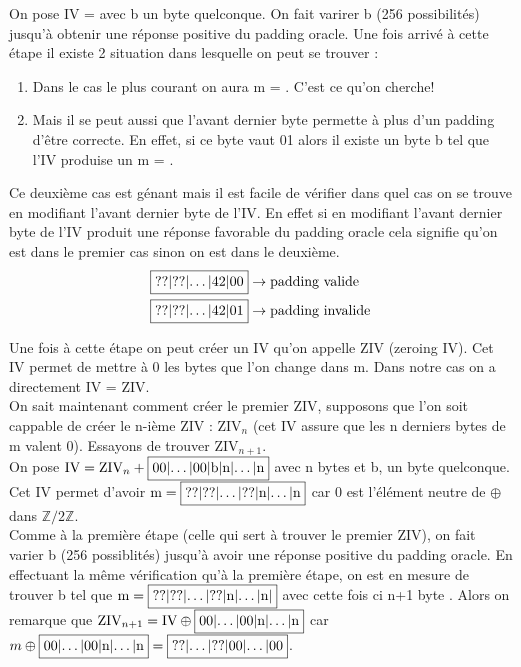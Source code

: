 \documentclass[a4paper, 12pt]{article}
\begin{document}
On pose IV =  avec b un byte quelconque. On fait varirer b (256 possibilités) jusqu'à obtenir une réponse positive du padding oracle. Une fois arrivé à cette étape il existe 2 situation dans lesquelle on peut se trouver :

\begin{enumerate}
	\item Dans le cas le plus courant on aura m = . C'est ce qu'on cherche!
	\item Mais il se peut aussi que l'avant dernier byte permette à plus d'un padding d'être correcte. En effet, si ce byte vaut 01 alors il existe un byte b tel que l'IV produise un m = .
\end{enumerate}

Ce deuxième cas est génant mais il est facile de vérifier dans quel cas on se trouve en modifiant l'avant dernier byte de l'IV.
En effet si en modifiant l'avant dernier byte de l'IV produit une réponse favorable du padding oracle cela signifie qu'on est dans le premier cas sinon on est dans le deuxième. 
\begin{align*}
	&\fbox{??|??|$\dots$|42|00} \rightarrow \text{padding valide}\\
	&\fbox{??|??|$\dots$|42|01} \rightarrow \text{padding invalide}
\end{align*}

Une fois à cette étape on peut créer un IV qu'on appelle ZIV (zeroing IV). Cet IV permet de mettre à 0 les bytes que l'on change dans m. Dans notre cas on a directement IV = ZIV. \\

On sait maintenant comment créer le premier ZIV, supposons que l'on soit cappable de créer le n-ième ZIV : $\text{ZIV}_n$ (cet IV assure que les n derniers bytes de m valent 0). Essayons de trouver $\text{ZIV}_{n+1}$. \\

On pose $\text{IV} = \text{ZIV}_n + \fbox{00|$\dots$|00|b|n|$\dots$|n}$ avec n bytes  et b, un byte quelconque. Cet IV permet d'avoir $\text{m} = \fbox{??|??|\dots|??|n|$\dots$|n}$ car 0 est l'élément neutre de $\oplus$ dans $\mathbb{Z}/2\mathbb{Z}$. \\
Comme à la première étape (celle qui sert à trouver le premier ZIV), on fait varier b (256 possiblités) jusqu'à avoir une réponse positive du padding oracle. En effectuant la même vérification qu'à la première étape, on est en mesure de trouver b tel que $\text{m} = \fbox{??|??|$\dots$|??|n|$\dots$|n|}$ avec cette fois ci n+1 byte . Alors on remarque que $\text{ZIV}_{n+1} = \text{IV} \oplus \fbox{00|$\dots$|00|n|$\dots$|n}$ car $m \oplus \fbox{00|$\dots$|00|n|$\dots$|n} = \fbox{??|$\dots$|??|00|$\dots$|00}$. \\
\end{document}
